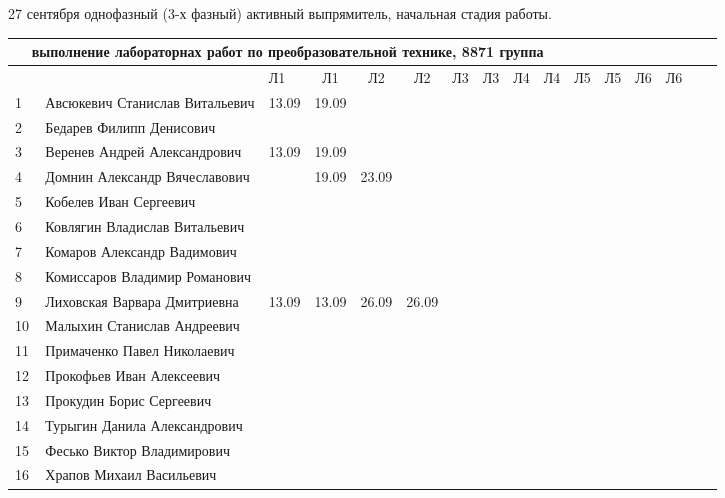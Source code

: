 27 сентября однофазный (3-х фазный) активный выпрямитель, начальная стадия работы.
\newpage
%


\newpage
%
\begin{tabular}{l|llccccccccccccc}
\multicolumn{10}{c}{выполнение лабораторнах работ по преобразовательной технике, 8871 группа} \\
\toprule
&&Л1&Л1& Л2&Л2& Л3&Л3& Л4&Л4 &Л5&Л5& Л6&Л6\\
\midrule
1\,& Авсюкевич Станислав Витальевич   &13.09&19.09\\
2\,& Бедарев Филипп Денисович         \\
3\,& Веренев Андрей Александрович     &13.09&19.09\\
4\,& Домнин Александр Вячеславович    &&19.09&23.09\\
\midrule
5\,& Кобелев Иван Сергеевич           \\
6\,& Ковлягин Владислав Витальевич    \\
7\,& Комаров Александр Вадимович      \\
8\,& Комиссаров Владимир Романович    \\
\midrule
9\,& Лиховская Варвара Дмитриевна     &13.09&13.09&26.09&26.09\\
10\,& Малыхин Станислав Андреевич     \\
11\,& Примаченко Павел Николаевич     \\
12\,& Прокофьев Иван Алексеевич       \\
\midrule
13\,& Прокудин Борис Сергеевич        \\
14\,& Турыгин Данила Александрович    \\
15\,& Фесько Виктор Владимирович      \\
16\,& Храпов Михаил Васильевич        \\
\bottomrule
\end{tabular}



